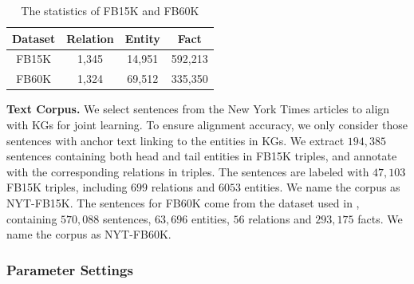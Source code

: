 \documentclass[11pt,a4paper]{article}
\begin{document}
\begin{table}[htb]
\centering
\small
\begin{tabular}{|c|c|c|c|}
\hline
Dataset & \textbf{Relation} & \textbf{Entity} & \textbf{Fact} \\ \hline
FB15K   & 1,345           & 14,951            & 592,213 \\ \hline
FB60K   & 1,324           & 69,512            & 335,350 \\ \hline
\end{tabular}
\caption{The statistics of FB15K and FB60K}
\label{tab:statistics-of-FB15K}
\end{table}

\textbf{Text Corpus.} We select sentences from the New York Times articles to align with KGs for joint learning. To ensure alignment accuracy, we only consider those sentences with anchor text linking to the entities in KGs. We extract $194,385$ sentences containing both head and tail entities in FB15K triples, and annotate with the corresponding relations in triples. The sentences are labeled with $47,103$ FB15K triples, including $699$ relations and $6053$ entities. We name the corpus as NYT-FB15K. The sentences for FB60K come from the dataset used in \cite{riedel2010modeling}, containing $570,088$ sentences, $63,696$ entities, $56$ relations and $293,175$ facts. We name the corpus as NYT-FB60K.







\subsubsection{Parameter Settings}
\end{document}
